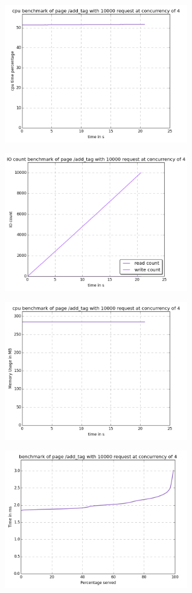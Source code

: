 \begin{center}
\includegraphics[width=0.6\textwidth]{img/add_tag.cpu.png}



\includegraphics[width=0.6\textwidth]{img/add_tag.io-count.png}



\includegraphics[width=0.6\textwidth]{img/add_tag.mem.png}



\includegraphics[width=0.6\textwidth]{img/add_tag.serv-time.png}




\end{center}
